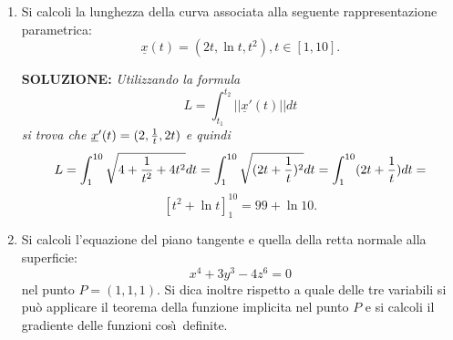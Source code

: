 \documentclass[12pt,a4paper]{report}\pagenumbering{roman}
\begin{document}
\begin{enumerate}
{\bf SOLUZIONE:} {\sl La matrice Jacobiana di $\underline{f}$ in $(1,0,1)$
\`e:
$$J(\underline{f})_{(1,0,1)}=
\left(\begin{array}{ccc} z& 0 & x \\ 1&2y  & 0 \\ yz& xz & xy
\end{array}\right)_{(1,0,1)}=
\left(\begin{array}{ccc}1 & 0 & 1 \\1 & 0 &0  \\ 0& 1 & 0\end{array}
\right).
$$
Dal teorema della funzione inversa otteniamo che 
$$J(\underline{f}^{-1})_{f(1,0,1)}=
\left(J(\underline{f})_{(1,0,1)}\right)^{-1}
=\left(\begin{array}{ccc}1 & 0 & 1 \\1 & 0 &0  \\ 0& 1 & 0\end{array}
\right)^{-1}.$$
Facendo i calcoli (dell'inversa di una matrice $3\times3$) troviamo
$$J(\underline{f}^{-1})_{(1,2,1)}=
\left(\begin{array}{ccc} 0& 1 & 0 \\0 & 0 & 1 \\ 1&-1  &0 \end{array}
\right).
$$}

\item Si calcoli la lunghezza della curva associata alla seguente rappresentazione 
parametrica:
$$\underline{x}(t)=\left(2t,\ln t,t^2\right), t\in[1,10].$$
\bigskip 

{\bf SOLUZIONE:} {\sl Utilizzando la formula
$$L=\int_{t_1}^{t_2}||\underline{x}'(t)||dt$$
si trova che $\underline{x}'(t)=(2,{1\over t},2t)$ e quindi
$$L=\int_{1}^{10}\sqrt{4+{1\over t^2}+4t^2}dt=
\int_{1}^{10}\sqrt{(2t+{1\over t})^2}dt=
\int_{1}^{10}(2t+{1\over t})dt=$$
$$\left[t^2+\ln t\right]^{10}_1=99+\ln 10.$$}


\item Si calcoli l'equazione del piano tangente e quella della retta normale alla
superficie:
$$x^4+3y^3-4z^6=0$$
nel punto $P=(1,1,1)$. Si dica inoltre rispetto a quale delle tre variabili
si pu\`o applicare il teorema della funzione implicita nel punto $P$ e si calcoli
il gradiente delle funzioni cos\`\i\ definite.
\bigskip 


\end{enumerate}
\end{document}
